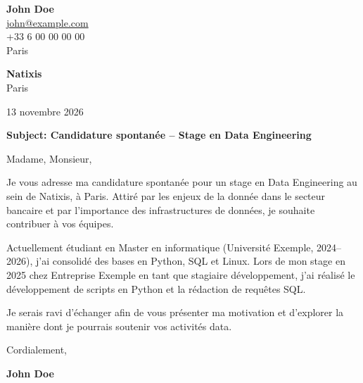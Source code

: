 \documentclass[11pt,a4paper]{article}
\begin{document}
{\Large\bfseries John Doe}\\[0.3cm]


\href{mailto:john@example.com}{john@example.com}\\



+33 6 00 00 00 00\\



Paris\\


\vspace{1cm}

\begin{flushright}

\textbf{Natixis}\\



Paris\\


\vspace{0.5cm}

13 novembre 2026

\end{flushright}

\vspace{0.8cm}

\textbf{Subject: Candidature spontanée – Stage en Data Engineering}

\vspace{0.6cm}


Madame, Monsieur,


\vspace{0.5cm}

\justifying


Je vous adresse ma candidature spontanée pour un stage en Data Engineering au sein de Natixis, à Paris. Attiré par les enjeux de la donnée dans le secteur bancaire et par l’importance des infrastructures de données, je souhaite contribuer à vos équipes.

\par

Actuellement étudiant en Master en informatique (Université Exemple, 2024–2026), j’ai consolidé des bases en Python, SQL et Linux. Lors de mon stage en 2025 chez Entreprise Exemple en tant que stagiaire développement, j’ai réalisé le développement de scripts en Python et la rédaction de requêtes SQL.

\par

Je serais ravi d’échanger afin de vous présenter ma motivation et d’explorer la manière dont je pourrais soutenir vos activités data.

\par


\vspace{0.7cm}


Cordialement,


\vspace{0.5cm}

\textbf{John Doe}
\end{document}
